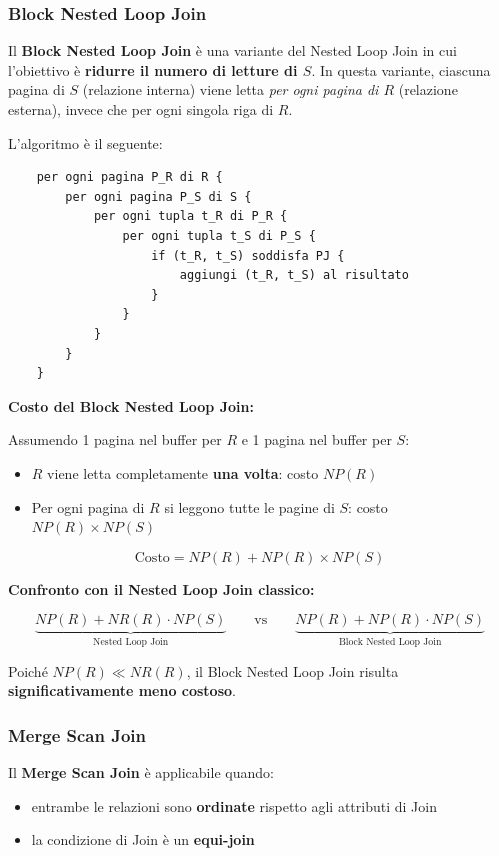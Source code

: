 \subsubsection{Block Nested Loop Join}

Il \textbf{Block Nested Loop Join} è una variante del Nested Loop Join in cui l'obiettivo è \textbf{ridurre il numero di letture di $S$}. In questa variante, ciascuna pagina di $S$ (relazione interna) viene letta \textit{per ogni pagina di $R$} (relazione esterna), invece che per ogni singola riga di $R$.

\bigskip
\noindent L'algoritmo è il seguente:

\begin{verbatim}
	per ogni pagina P_R di R {
		per ogni pagina P_S di S {
			per ogni tupla t_R di P_R {
				per ogni tupla t_S di P_S {
					if (t_R, t_S) soddisfa PJ {
						aggiungi (t_R, t_S) al risultato
					}
				}
			}
		}
	}
\end{verbatim}

\bigskip
\noindent\textbf{Costo del Block Nested Loop Join:}

\bigskip
\noindent Assumendo 1 pagina nel buffer per $R$ e 1 pagina nel buffer per $S$:
\begin{itemize}
	\item $R$ viene letta completamente \textbf{una volta}: costo $NP(R)$
	\item Per ogni pagina di $R$ si leggono tutte le pagine di $S$: costo $NP(R) \times NP(S)$
\end{itemize}

\[
\text{Costo} = NP(R) + NP(R) \times NP(S)
\]

\bigskip
\noindent\textbf{Confronto con il Nested Loop Join classico:}

\[
\underbrace{NP(R) + NR(R) \cdot NP(S)}_{\text{Nested Loop Join}}
\qquad \text{vs} \qquad
\underbrace{NP(R) + NP(R) \cdot NP(S)}_{\text{Block Nested Loop Join}}
\]

\noindent Poiché $NP(R) \ll NR(R)$, il Block Nested Loop Join risulta \textbf{significativamente meno costoso}.
\subsubsection{Merge Scan Join}

Il \textbf{Merge Scan Join} è applicabile quando:
\begin{itemize}
	\item entrambe le relazioni sono \textbf{ordinate} rispetto agli attributi di Join
	\item la condizione di Join è un \textbf{equi-join}
\end{itemize}

